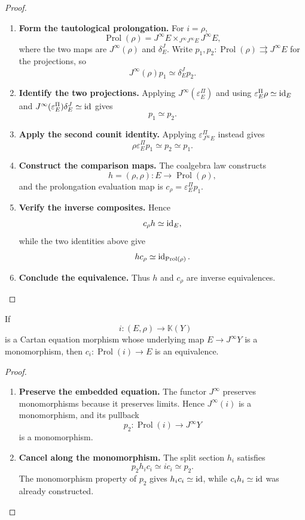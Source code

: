 \begin{proof}
\leavevmode
\begin{enumerate}[label=\textup{(\arabic*)}]
    \item \textbf{Form the tautological prolongation.}
For \(i=\rho\),
\[
  \operatorname{Prol}(\rho)
  =
  J^\infty E
  \times_{J^\infty J^\infty E}
  J^\infty E,
\]
where the two maps are \(J^\infty(\rho)\) and \(\delta^J_E\). Write
\(p_1,p_2:\operatorname{Prol}(\rho)\rightrightarrows J^\infty E\) for the projections, so
\[
  J^\infty(\rho)p_1\simeq\delta^J_Ep_2.
\]

    \item \textbf{Identify the two projections.}
Applying \(J^\infty(\varepsilon^\Pi_E)\) and using
\(\varepsilon^\Pi_E\rho\simeq\operatorname{id}_E\) and
\(J^\infty(\varepsilon^\Pi_E)\delta^J_E\simeq\operatorname{id}\) gives
\[
  p_1\simeq p_2.
\]

    \item \textbf{Apply the second counit identity.}
Applying \(\varepsilon^\Pi_{J^\infty E}\) instead gives
\[
  \rho\varepsilon^\Pi_Ep_1\simeq p_2\simeq p_1.
\]

    \item \textbf{Construct the comparison maps.}
The coalgebra law constructs
\[
  h=(\rho,\rho):E\to \operatorname{Prol}(\rho),
\]
and the prolongation evaluation map is \(c_\rho=\varepsilon^\Pi_Ep_1\).

    \item \textbf{Verify the inverse composites.}
Hence
\[
  c_\rho h\simeq\operatorname{id}_E,
\]
while the two identities above give
\[
  hc_\rho\simeq\operatorname{id}_{\operatorname{Prol}(\rho)}.
\]

    \item \textbf{Conclude the equivalence.}
Thus \(h\) and \(c_\rho\) are inverse equivalences.
\end{enumerate}
\end{proof}

\begin{theorem}
If
\[
  i:(E,\rho)\to\mathbb K(Y)
\]
is a Cartan equation morphism whose underlying map
\(E\to J^\infty Y\) is a monomorphism, then \(c_i:\operatorname{Prol}(i)\to E\) is an
equivalence.
\end{theorem}

\begin{proof}
\leavevmode
\begin{enumerate}[label=\textup{(\arabic*)}]
    \item \textbf{Preserve the embedded equation.}
The functor \(J^\infty\) preserves monomorphisms because it preserves limits.
Hence \(J^\infty(i)\) is a monomorphism, and its pullback
\[
  p_2:\operatorname{Prol}(i)\to J^\infty Y
\]
is a monomorphism.

    \item \textbf{Cancel along the monomorphism.}
The split section \(h_i\) satisfies
\[
  p_2h_ic_i
  \simeq
  ic_i
  \simeq
  p_2.
\]
The monomorphism property of \(p_2\) gives \(h_ic_i\simeq\operatorname{id}\), while
\(c_ih_i\simeq\operatorname{id}\) was already constructed.
\end{enumerate}
\end{proof}

